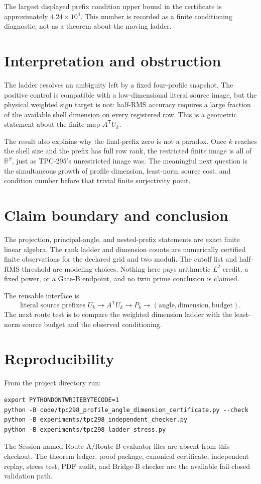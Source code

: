 \documentclass[10pt]{article}
\newcommand{\R}{\mathbb{R}}
\begin{document}
The largest displayed prefix condition upper bound in the certificate is
approximately $4.24\times10^4$.  This number is recorded as a finite
conditioning diagnostic, not as a theorem about the moving ladder.

\section{Interpretation and obstruction}

The ladder resolves an ambiguity left by a fixed four-profile snapshot.  The
positive control is compatible with a low-dimensional literal source image,
but the physical weighted sign target is not: half-RMS accuracy requires a
large fraction of the available shell dimension on every registered row.
This is a geometric statement about the finite map $A^{\mathsf T}U_k$.

The result also explains why the final-prefix zero is not a paradox.  Once
$k$ reaches the shell size and the prefix has full row rank, the restricted
finite image is all of $\R^{S}$, just as TPC-295's unrestricted image was.
The meaningful next question is the simultaneous growth of profile dimension,
least-norm source cost, and condition number before that trivial finite
surjectivity point.

\section{Claim boundary and conclusion}

The projection, principal-angle, and nested-prefix statements are exact finite
linear algebra.  The rank ladder and dimension counts are numerically
certified finite observations for the declared grid and two moduli.  The
cutoff list and half-RMS threshold are modeling choices.  Nothing here pays
arithmetic $L^2$ credit, a fixed power, or a Gate-B endpoint, and no twin
prime conclusion is claimed.

The reusable interface is
\[
 \text{literal source prefixes }U_k
 \longrightarrow A^{\mathsf T}U_k
 \longrightarrow P_k
 \longrightarrow (\text{angle},\text{dimension},\text{budget}).
\]
The next route test is to compare the weighted dimension ladder with the
least-norm source budget and the observed conditioning.

\section*{Reproducibility}

From the project directory run:
\begin{verbatim}
export PYTHONDONTWRITEBYTECODE=1
python -B code/tpc298_profile_angle_dimension_certificate.py --check
python -B experiments/tpc298_independent_checker.py
python -B experiments/tpc298_ladder_stress.py
\end{verbatim}
The Session-named Route-A/Route-B evaluator files are absent from this
checkout.  The theorem ledger, proof package, canonical certificate,
independent replay, stress test, PDF audit, and Bridge-B checker are the
available fail-closed validation path.

\enlargethispage{3\baselineskip}
\small


\end{document}
